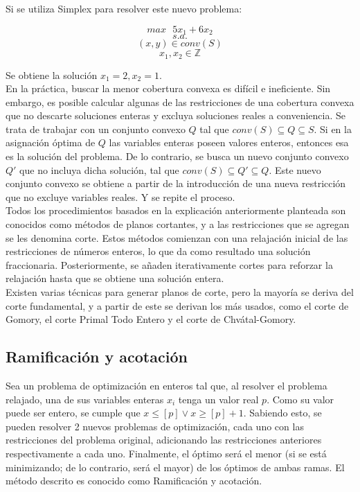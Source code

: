 \documentclass[12pt]{report}
\begin{document}
Si se utiliza Simplex para resolver este nuevo problema:

$$max \text{ } 5x_1+6x_2$$
$$s.a.$$
$$(x,y) \in conv(S)$$
$$x_1,x_2\in\mathbb{Z}$$

Se obtiene la solución $x_1=2, x_2=1$.\\

En la práctica, buscar la menor cobertura convexa es difícil e ineficiente. Sin embargo, es posible calcular algunas de las restricciones de una cobertura convexa que no descarte soluciones enteras y excluya soluciones reales a conveniencia. Se trata de trabajar con un conjunto convexo $Q$ tal que $conv(S)\subseteq Q\subseteq S$. Si en la asignación óptima de $Q$ las variables enteras poseen valores enteros, entonces esa es la solución del problema. De lo contrario, se busca un nuevo conjunto convexo $Q'$ que no incluya dicha solución, tal que $conv(S)\subseteq Q'\subseteq Q$. Este nuevo conjunto convexo se obtiene a partir de la introducción de una nueva restricción que no excluye variables reales. Y se repite el proceso.\\

Todos los procedimientos basados en la explicación anteriormente planteada son conocidos como métodos de planos cortantes, y a las restricciones que se agregan se les denomina corte. Estos métodos comienzan con una relajación inicial de las restricciones de números enteros, lo que da como resultado una solución fraccionaria. Posteriormente, se añaden iterativamente cortes para reforzar la relajación hasta que se obtiene una solución entera.\\

Existen varias técnicas para generar planos de corte, pero la mayoría se deriva del corte fundamental, y a partir de este se derivan los más usados, como el corte de Gomory, el corte Primal Todo Entero y el corte  de Chvátal-Gomory.\\


\subsection{Ramificación y acotación}

Sea un problema de optimización en enteros tal que, al resolver el problema relajado, una de sus variables enteras $x_i$ tenga un valor real $p$. Como su valor puede ser entero, se cumple que $x \leq  [p] \lor  x \geq  [p]+1$. Sabiendo esto, se pueden resolver 2 nuevos problemas de optimización, cada uno con las restricciones del problema original, adicionando las restricciones anteriores respectivamente a cada uno. Finalmente, el óptimo será el menor (si se está minimizando; de lo contrario, será el mayor) de los óptimos de ambas ramas. El método descrito es conocido como Ramificación y acotación. \\
\end{document}
